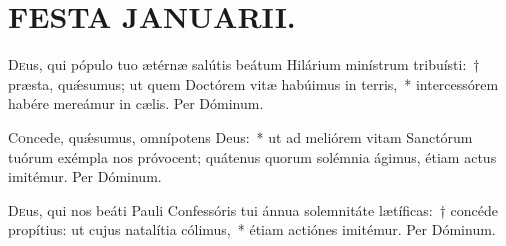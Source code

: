 \documentclass[vesperale_romanum.tex]{subfiles}
\begin{document}
\section[Festa Januarii]{FESTA JANUARII.}


\duplexmtv


\oratio

\lettrine{D}{e}us, qui pópulo tuo ætérnæ salútis beátum Hilárium minístrum tribuísti:~† præsta, quǽsumus; ut quem Do\-ctórem vitæ habúimus in terris,~* intercessórem habére mereámur in cælis.
Per Dóminum.


\oratio

\lettrine{C}{o}ncede, quǽsumus, omnípotens Deus:~* ut ad meliórem vitam Sanctórum tuórum exémpla nos próvocent; quátenus quorum solémnia ágimus, étiam actus imitémur.
Per Dóminum.

\myrule


\duplexmtv

\oratio

\lettrine{D}{e}us, qui nos beáti Pauli Confessóris tui ánnua sole\-mnitáte lætíficas:~† concéde propítius: ut cujus natalítia cólimus,~* étiam actiónes imitémur. Per Dóminum.



\end{document}
